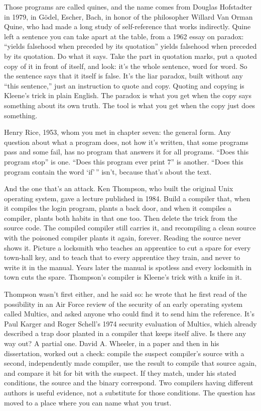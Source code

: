 \documentclass[11pt,twoside]{article}
\theoremstyle{thielethm}
\theoremstyle{thieledef}
\theoremstyle{thieledef}
\theoremstyle{thieledef}
\theoremstyle{thielethm}
\theoremstyle{thieleobs}
\theoremstyle{thielethm}
\begin{document}
Those programs are called quines, and the name comes from Douglas Hofstadter in 1979, in Gödel, Escher, Bach, in honor of the philosopher Willard Van Orman Quine, who had made a long study of self-reference that works indirectly. Quine left a sentence you can take apart at the table, from a 1962 essay on paradox: ``yields falsehood when preceded by its quotation'' yields falsehood when preceded by its quotation. Do what it says. Take the part in quotation marks, put a quoted copy of it in front of itself, and look: it's the whole sentence, word for word. So the sentence says that it itself is false. It's the liar paradox, built without any ``this sentence,'' just an instruction to quote and copy. Quoting and copying is Kleene's trick in plain English. The paradox is what you get when the copy says something about its own truth. The tool is what you get when the copy just does something.

Henry Rice, 1953, whom you met in chapter seven: the general form. Any question about what a program does, not how it's written, that some programs pass and some fail, has no program that answers it for all programs. ``Does this program stop'' is one. ``Does this program ever print 7'' is another. ``Does this program contain the word `if'\,'' isn't, because that's about the text.

And the one that's an attack. Ken Thompson, who built the original Unix operating system, gave a lecture published in 1984. Build a compiler that, when it compiles the login program, plants a back door, and when it compiles a compiler, plants both habits in that one too. Then delete the trick from the source code. The compiled compiler still carries it, and recompiling a clean source with the poisoned compiler plants it again, forever. Reading the source never shows it. Picture a locksmith who teaches an apprentice to cut a spare for every town-hall key, and to teach that to every apprentice they train, and never to write it in the manual. Years later the manual is spotless and every locksmith in town cuts the spare. Thompson's compiler is Kleene's trick with a knife in it.

Thompson wasn't first either, and he said so: he wrote that he first read of the possibility in an Air Force review of the security of an early operating system called Multics, and asked anyone who could find it to send him the reference. It's Paul Karger and Roger Schell's 1974 security evaluation of Multics, which already described a trap door planted in a compiler that keeps itself alive. Is there any way out? A partial one. David A. Wheeler, in a paper and then in his dissertation, worked out a check: compile the suspect compiler's source with a second, independently made compiler, use the result to compile that source again, and compare it bit for bit with the suspect. If they match, under his stated conditions, the source and the binary correspond. Two compilers having different authors is useful evidence, not a substitute for those conditions. The question has moved to a place where you can name what you trust.
\end{document}
